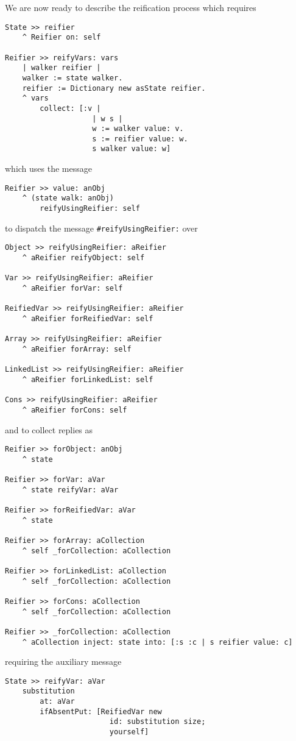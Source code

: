\documentclass[a4paper,11pt]{article}
\begin{document}
We are now ready to describe the reification process which
requires
\begin{verbatim}
State >> reifier
    ^ Reifier on: self

Reifier >> reifyVars: vars
    | walker reifier |
    walker := state walker.
    reifier := Dictionary new asState reifier.
    ^ vars
        collect: [:v |
                    | w s |
                    w := walker value: v.
                    s := reifier value: w.
                    s walker value: w]
\end{verbatim}
which uses the message
\begin{verbatim}
Reifier >> value: anObj
    ^ (state walk: anObj)
        reifyUsingReifier: self
\end{verbatim}
to dispatch the message \Verb|#reifyUsingReifier:| over
\begin{verbatim}
Object >> reifyUsingReifier: aReifier
    ^ aReifier reifyObject: self

Var >> reifyUsingReifier: aReifier
    ^ aReifier forVar: self

ReifiedVar >> reifyUsingReifier: aReifier
    ^ aReifier forReifiedVar: self

Array >> reifyUsingReifier: aReifier
    ^ aReifier forArray: self

LinkedList >> reifyUsingReifier: aReifier
    ^ aReifier forLinkedList: self

Cons >> reifyUsingReifier: aReifier
    ^ aReifier forCons: self
\end{verbatim}
and to collect replies as
\begin{verbatim}
Reifier >> forObject: anObj
    ^ state

Reifier >> forVar: aVar
    ^ state reifyVar: aVar

Reifier >> forReifiedVar: aVar
    ^ state

Reifier >> forArray: aCollection
    ^ self _forCollection: aCollection

Reifier >> forLinkedList: aCollection
    ^ self _forCollection: aCollection

Reifier >> forCons: aCollection
    ^ self _forCollection: aCollection

Reifier >> _forCollection: aCollection
    ^ aCollection inject: state into: [:s :c | s reifier value: c]
\end{verbatim}
requiring the auxiliary message
\begin{verbatim}
State >> reifyVar: aVar
    substitution
        at: aVar
        ifAbsentPut: [ReifiedVar new
                        id: substitution size;
                        yourself]
\end{verbatim}
\end{document}
